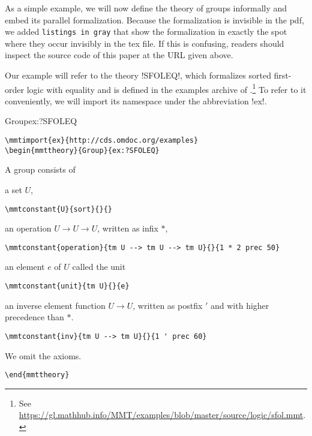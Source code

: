 As a simple example, we will now define the theory of groups informally and embed its parallel \mmt formalization.
Because the formalization is invisible in the pdf, we added \lstinline|listings in gray| that show the formalization in exactly the spot where they occur invisibly in the tex file.
If this is confusing, readers should inspect the source code of this paper at the URL given above.

Our example will refer to the theory !SFOLEQ!, which formalizes sorted first-order logic with equality and is defined in the examples archive of \mmt.\footnote{See \url{https://gl.mathhub.info/MMT/examples/blob/master/source/logic/sfol.mmt}.}
To refer to it conveniently, we will import its namespace under the abbreviation !ex!.

\begin{mmttheory}{Group}{ex:?SFOLEQ}
\begin{lstlisting}
\mmtimport{ex}{http://cds.omdoc.org/examples}
\begin{mmttheory}{Group}{ex:?SFOLEQ}
\end{lstlisting}

A group consists of
\begin{compactitem}
 \item a set $U$,
\begin{lstlisting}
\mmtconstant{U}{sort}{}{}
\end{lstlisting}

 \item an operation $U\to U \to U$, written as infix $*$,
\begin{lstlisting}
\mmtconstant{operation}{tm U --> tm U --> tm U}{}{1 * 2 prec 50}
\end{lstlisting}

 \item an element $e$ of $U$ called the unit
\begin{lstlisting}
\mmtconstant{unit}{tm U}{}{e}
\end{lstlisting}

\item an inverse element function $U\to U$, written as postfix $'$ and with higher precedence than $*$.
\begin{lstlisting}
\mmtconstant{inv}{tm U --> tm U}{}{1 ' prec 60}
\end{lstlisting}
\end{compactitem}
We omit the axioms.

\end{mmttheory}
\begin{lstlisting}
\end{mmttheory}
\end{lstlisting}

